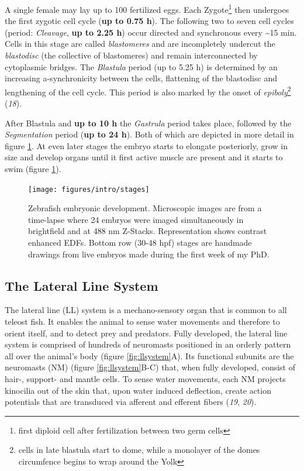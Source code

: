 \documentclass[11pt,singlespacinge,twoside]{reedthesis} %
\begin{document}
A single female may lay up to 100 fertilized eggs. Each Zygote\footnote{first diploid cell after fertilization between two germ cells} then undergoes the first zygotic cell cycle (\textbf{up to 0.75 h}). The following two to seven cell cycles (period: \emph{Cleavage}, \textbf{up to 2.25 h}) occur directed and synchronous every \textasciitilde{}15 min. Cells in this stage are called \emph{blastomeres} and are incompletely undercut the \emph{blastodisc} (the collective of blastomeres) and remain interconnected by cytoplasmic bridges. The \emph{Blastula} period (up to 5.25 h) is determined by an increasing a-synchronicity between the cells, flattening of the blastodisc and lengthening of the cell cycle. This period is also marked by the onset of \emph{epiboly}\footnote{cells in late blastula start to dome, while a monolayer of the domes circumfence begins to wrap around the Yolk} (\emph{18}).

After Blastula and \textbf{up to 10 h} the \emph{Gastrula} period takes place, followed by the \emph{Segmentation} period (\textbf{up to 24 h}). Both of which are depicted in more detail in figure \ref{fig:stages}. At even later stages the embryo starts to elongate posteriorly, grow in size and develop organs until it first active muscle are present and it starts to swim (figure \ref{fig:stages}).


\begin{figure}

{\centering \texttt{[image: figures/intro/stages]} 

}

\caption[Zebrafish embryonic development]{Zebrafish embryonic development. Microscopic images are from a time-lapse where 24 embryos were imaged simultaneously in brightfield and at 488 nm Z-Stacks. Representation shows contrast enhanced EDFs. Bottom row (30-48 hpf) stages are handmade drawings from live embryos made during the first week of my PhD.}\label{fig:stages}
\end{figure}
\hypertarget{the-lateral-line-system}{%
\subsection{The Lateral Line System}\label{the-lateral-line-system}}

The lateral line (LL) system is a mechano-sensory organ that is common to all teleost fish. It enables the animal to sense water movements and therefore to orient itself, and to detect prey and predators. Fully developed, the lateral line system is comprised of hundreds of neuromasts positioned in an orderly pattern all over the animal's body (figure \ref{fig:llsystem}A). Its functional subunits are the neuromasts (NM) (figure \ref{fig:llsystem}B-C) that, when fully developed, consist of hair-, support- and mantle cells. To sense water movements, each NM projects kinocilia out of the skin that, upon water induced deflection, create action potentials that are transduced via afferent and efferent fibers (\emph{19}, \emph{20}).
\end{document}
